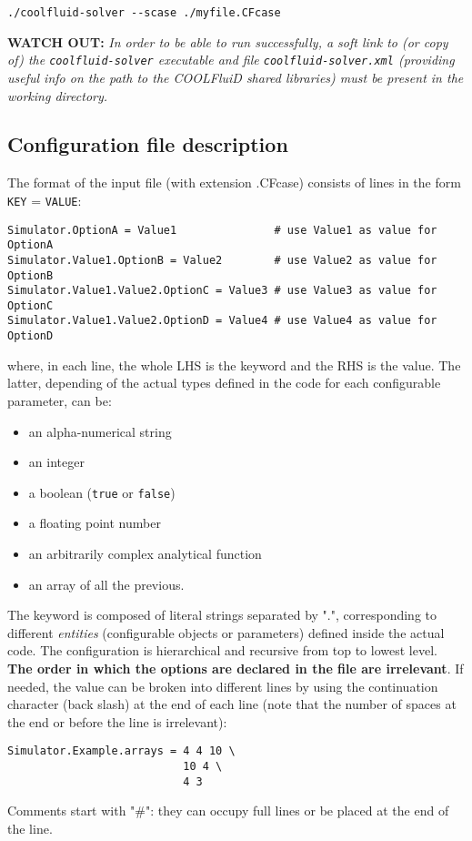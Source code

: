 \documentclass[11pt]{article}
\begin{document}
\begin{verbatim}
./coolfluid-solver --scase ./myfile.CFcase
\end{verbatim}

{\bf WATCH OUT:} {\it In order to be able to run successfully, a soft link to (or copy of) the {\tt coolfluid-solver} executable and file {\tt coolfluid-solver.xml} (providing useful info on the path to the COOLFluiD shared libraries) must be present in the working directory.}
  

\subsection{Configuration file description}

The format of the input file (with extension .CFcase) consists of lines in the form {\tt KEY} = {\tt VALUE}:
\vspace{-0.2cm}
\begin{verbatim}
Simulator.OptionA = Value1               # use Value1 as value for OptionA
Simulator.Value1.OptionB = Value2        # use Value2 as value for OptionB
Simulator.Value1.Value2.OptionC = Value3 # use Value3 as value for OptionC
Simulator.Value1.Value2.OptionD = Value4 # use Value4 as value for OptionD
\end{verbatim} 
where, in each line, the whole LHS is the keyword and the RHS is the value. The
latter, depending of the actual types defined in the code for each configurable parameter, can be:

\begin{itemize}
\item
  an alpha-numerical string
\item
  an integer
\item 
  a boolean (\texttt{true} or \texttt{false})
\item
  a floating point number
\item
  an arbitrarily complex analytical function
\item
  an array of all the previous.
\end{itemize}
The keyword is composed of literal strings separated by ".",
corresponding to different \textit{entities} (configurable
objects or parameters) defined inside the actual code. The
configuration is hierarchical and recursive from top to lowest
level. {\bf The order in which the options are declared in the file are
  irrelevant}. If needed, the value can be broken into different lines by using the continuation character (back slash) 
at the end of each line (note that the number of spaces at the end or
before the line is irrelevant):
\vspace{-0.2cm}
\begin{verbatim}
Simulator.Example.arrays = 4 4 10 \
                           10 4 \
                           4 3
\end{verbatim}
Comments start with "\#": they can occupy full lines or be placed at the end of the line.
\end{document}
